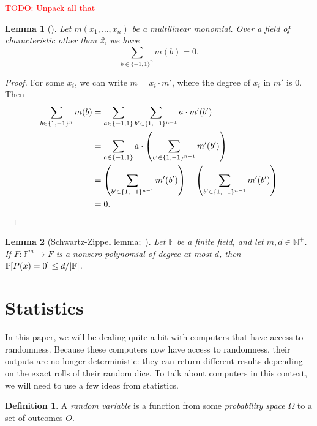 \documentclass[english,12pt]{reedthesis}
\theoremstyle{plain}
\newtheorem{lemma}[lemma]{Lemma}
\theoremstyle{definition}
\newtheorem{defn}[defn]{Definition}
\theoremstyle{remark}
\DeclarePairedDelimiter{\abs}{\lvert}{\rvert}
\newcommand{\TODO}[1]{\textcolor{red}{TODO: #1}}
\begin{document}
\TODO{Unpack all that}

\begin{lemma}[{\cite[Lemma 7]{JKRS09}}]\label{lem:monomial-sum}
  Let $m(x_{1}, \ldots, x_{n})$ be a multilinear monomial. Over a field of
  characteristic other than 2, we have
  \begin{equation}
    \sum_{b \in \{-1, 1\}^{n}}m(b) = 0.
  \end{equation}
\end{lemma}

\begin{proof}
  For some $x_{i}$, we can write $m = x_{i} \cdot m'$, where the degree of $x_{i}$
  in $m'$ is 0. Then
  \begin{align*}
    \sum_{b \in \{1, -1\}^{n}}m(b)
    &= \sum_{a \in \{-1, 1\}}\sum_{b' \in \{1, -1\}^{n-1}}a \cdot m'(b') \\
    &= \sum_{a \in \{-1, 1\}} a \cdot \mleft(\sum_{b' \in \{1, -1\}^{n-1}} m'(b')\mright) \\
    &= \mleft(\sum_{b' \in \{1, -1\}^{n-1}} m'(b')\mright) - \mleft(\sum_{b' \in \{1, -1\}^{n-1}} m'(b')\mright) \\
    &= 0.
  \end{align*}
\end{proof}

\begin{lemma}[Schwartz-Zippel lemma;~\cite{Sch80,Zip79}]%
  \label{lem:schwartz-zippel}
  Let $\mathbb{F}$ be a finite field, and let $m, d \in \mathbb{N}^{+}$. If
  $F\colon \mathbb{F}^{m} \rightarrow F$ is a nonzero polynomial of degree at most $d$, then
  $\mathbb{P}[P(x) = 0] \le d/\abs{\mathbb{F}}$.
\end{lemma}

\section{Statistics}\label{sec:statistics}

In this paper, we will be dealing quite a bit with computers that have access to
randomness. Because these computers now have access to randomness, their outputs
are no longer deterministic: they can return different results depending on the
exact rolls of their random dice. To talk about computers in this context, we
will need to use a few ideas from statistics.

\begin{defn}\label{def:random-var}
  A \emph{random variable} is a function from some \emph{probability space} $\Omega$
  to a set of outcomes $O$.
\end{defn}
\end{document}

